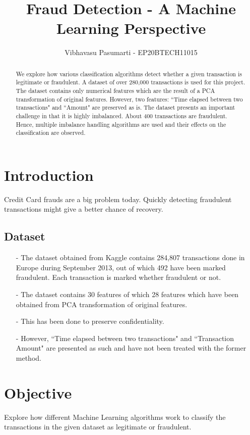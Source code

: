 \documentclass[letterpaper, 10 pt, conference]{ieeeconf}  %
\title{\Large \bf Fraud Detection - A Machine Learning Perspective}
\author{Vibhavasu Pasumarti - EP20BTECH11015}
\begin{document}
\maketitle

\begin{abstract}
    We explore how various classification algorithms detect whether a given transaction is legitimate or fraudulent. A dataset of over 280,000 transactions is used for this project. The dataset contains only numerical features which are the result of a PCA transformation of original features. However, two features: ``Time elapsed between two transactions" and ``Amount" are preserved as is. The dataset presents an important challenge in that it is highly imbalanced. About 400 transactions are fraudulent. Hence, multiple imbalance handling algorithms are used and their effects on the classification are observed. 
\end{abstract}

\section{Introduction}\label{sec:intro}
Credit Card frauds are a big problem today. Quickly detecting fraudulent transactions might give a better chance of recovery.

\subsection*{Dataset}
\begin{itemize}
\item[-] The dataset obtained from Kaggle contains 284,807 transactions done in Europe during September 2013, out of which 492 have been marked fraudulent. Each transaction is marked whether fraudulent or not.
\item[-] The dataset contains 30 features of which 28 features which have been obtained from PCA transformation of original features.
\item[-] This has been done to preserve confidentiality.
\item[-] However, ``Time elapsed between two transactions" and ``Transaction Amount" are presented as such and have not been treated with the former method.
\end{itemize}

\section{Objective}
Explore how different Machine Learning algorithms work to classify the transactions in the given dataset as legitimate or fraudulent.\\
\end{document}
